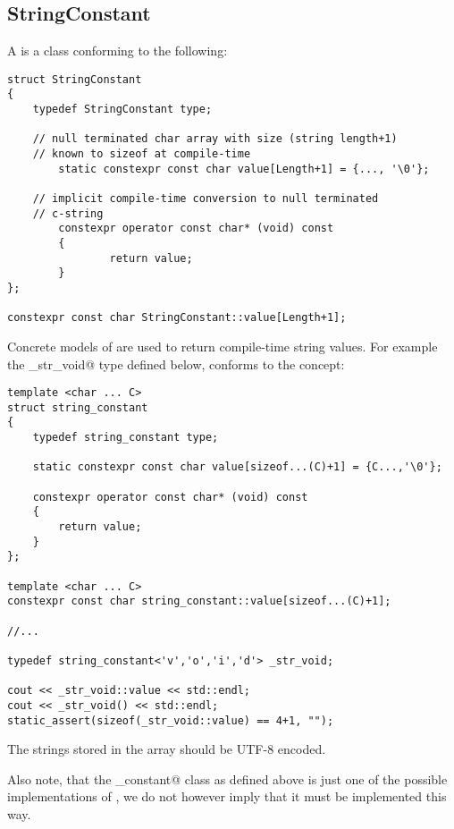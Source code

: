 \subsection{StringConstant}
\label{concept-StringConstant}

A  is a class conforming to the following:

\begin{verbatim}
struct StringConstant
{
	typedef StringConstant type;

	// null terminated char array with size (string length+1)
	// known to sizeof at compile-time
        static constexpr const char value[Length+1] = {..., '\0'};

	// implicit compile-time conversion to null terminated
	// c-string
        constexpr operator const char* (void) const
        {
                return value;
        }
};

constexpr const char StringConstant::value[Length+1];
\end{verbatim}

Concrete models of  are used to return compile-time string values.
For example the \verb@_str_void@ type defined below, conforms to the 
concept:

\begin{verbatim}
template <char ... C>
struct string_constant
{
	typedef string_constant type;

	static constexpr const char value[sizeof...(C)+1] = {C...,'\0'};

	constexpr operator const char* (void) const
	{
		return value;
	}
};

template <char ... C>
constexpr const char string_constant::value[sizeof...(C)+1];

//...

typedef string_constant<'v','o','i','d'> _str_void;

cout << _str_void::value << std::endl;
cout << _str_void() << std::endl;
static_assert(sizeof(_str_void::value) == 4+1, "");
\end{verbatim}

The strings stored in the \verb@value@ array should be UTF-8 encoded.

Also note, that the \verb@string_constant@ class as defined above is just one of the
possible implementations of , we do not however imply
that it must be implemented this way.
